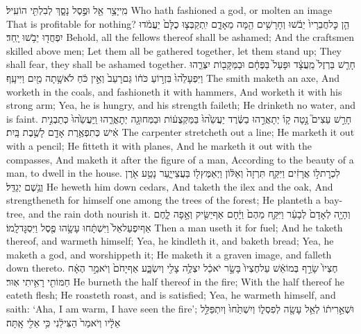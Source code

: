 {מִֽי\maqqaf יָצַ֥ר אֵ֖ל וּפֶ֣סֶל נָסָ֑ךְ לְבִלְתִּ֖י הוֹעִֽיל׃}
{Who hath fashioned a god, or molten an image That is profitable for nothing?}
{הֵ֤ן כׇּל\maqqaf חֲבֵרָיו֙ יֵבֹ֔שׁוּ וְחָרָשִׁ֥ים הֵ֖מָּה מֵאָדָ֑ם יִֽתְקַבְּצ֤וּ כֻלָּם֙ יַעֲמֹ֔דוּ יִפְחֲד֖וּ יֵבֹ֥שׁוּ יָֽחַד׃}
{Behold, all the fellows thereof shall be ashamed; And the craftsmen skilled above men; Let them all be gathered together, let them stand up; They shall fear, they shall be ashamed together.}
{חָרַ֤שׁ בַּרְזֶל֙ מַֽעֲצָ֔ד וּפָעַל֙ בַּפֶּחָ֔ם וּבַמַּקָּב֖וֹת יִצְּרֵ֑הוּ וַיִּפְעָלֵ֙הוּ֙ בִּזְר֣וֹעַ כֹּח֔וֹ גַּם\maqqaf רָעֵב֙ וְאֵ֣ין כֹּ֔חַ לֹא\maqqaf שָׁ֥תָה מַ֖יִם וַיִּיעָֽף׃}
{The smith maketh an axe, And worketh in the coals, and fashioneth it with hammers, And worketh it with his strong arm; Yea, he is hungry, and his strength faileth; He drinketh no water, and is faint.}
{חָרַ֣שׁ עֵצִים֮ נָ֣טָה קָו֒ יְתָאֲרֵ֣הוּ בַשֶּׂ֔רֶד יַעֲשֵׂ֙הוּ֙ בַּמַּקְצֻע֔וֹת וּבַמְּחוּגָ֖ה יְתׇאֳרֵ֑הוּ וַֽיַּעֲשֵׂ֙הוּ֙ כְּתַבְנִ֣ית אִ֔ישׁ כְּתִפְאֶ֥רֶת אָדָ֖ם לָשֶׁ֥בֶת בָּֽיִת׃}
{The carpenter stretcheth out a line; He marketh it out with a pencil; He fitteth it with planes, And he marketh it out with the compasses, And maketh it after the figure of a man, According to the beauty of a man, to dwell in the house.}
{לִכְרׇת\maqqaf ל֣וֹ אֲרָזִ֔ים וַיִּקַּ֤ח תִּרְזָה֙ וְאַלּ֔וֹן וַיְאַמֶּץ\maqqaf ל֖וֹ בַּעֲצֵי\maqqaf יָ֑עַר נָטַ֥ע אֹ֖רֶ{\footnotesize ן} וְגֶ֥שֶׁם יְגַדֵּֽל׃}
{He heweth him down cedars, And taketh the ilex and the oak, And strengtheneth for himself one among the trees of the forest; He planteth a bay-tree, and the rain doth nourish it.}
{וְהָיָ֤ה לְאָדָם֙ לְבָעֵ֔ר וַיִּקַּ֤ח מֵהֶם֙ וַיָּ֔חׇם אַף\maqqaf יַשִּׂ֖יק וְאָ֣פָה לָ֑חֶם אַף\maqqaf יִפְעַל\maqqaf אֵל֙ וַיִּשְׁתָּ֔חוּ עָשָׂ֥הוּ פֶ֖סֶל וַיִּסְגׇּד\maqqaf לָֽמוֹ׃}
{Then a man useth it for fuel; And he taketh thereof, and warmeth himself; Yea, he kindleth it, and baketh bread; Yea, he maketh a god, and worshippeth it; He maketh it a graven image, and falleth down thereto.}
{חֶצְיוֹ֙ שָׂרַ֣ף בְּמוֹ\maqqaf אֵ֔שׁ עַל\maqqaf חֶצְיוֹ֙ בָּשָׂ֣ר יֹאכֵ֔ל יִצְלֶ֥ה צָלִ֖י וְיִשְׂבָּ֑ע אַף\maqqaf יָחֹם֙ וְיֹאמַ֣ר הֶאָ֔ח חַמּוֹתִ֖י רָאִ֥יתִי אֽוּר׃}
{He burneth the half thereof in the fire; With the half thereof he eateth flesh; He roasteth roast, and is satisfied; Yea, he warmeth himself, and saith: ‘Aha, I am warm, I have seen the fire’;}
{וּשְׁאֵ֣רִית֔וֹ לְאֵ֥ל עָשָׂ֖ה לְפִסְל֑וֹ  וְיִשְׁתַּ֙חוּ֙ וְיִתְפַּלֵּ֣ל אֵלָ֔יו וְיֹאמַר֙ הַצִּילֵ֔נִי כִּ֥י אֵלִ֖י אָֽתָּה׃}
